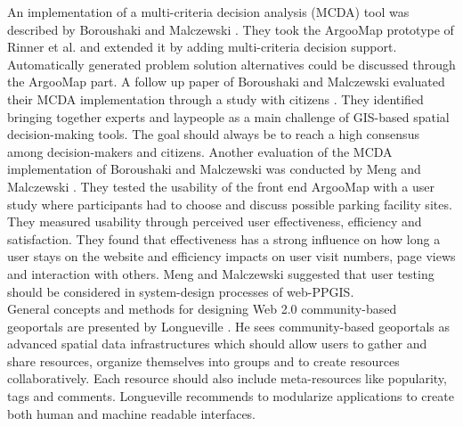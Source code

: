 An implementation of a multi-criteria decision analysis (MCDA) tool was described by Boroushaki and Malczewski \cite{Boroushaki2010_ParticipatoryGIS}. They took the ArgooMap prototype of Rinner et al. \cite{Rinner2009_Web2_argumap} and extended it by adding multi-criteria decision support. Automatically generated problem solution alternatives could be discussed through the ArgooMap part. A follow up paper of Boroushaki and Malczewski evaluated their MCDA implementation through a study with citizens \cite{Boroushaki2010_Consensus_measurement}. They identified bringing together experts and laypeople as a main challenge of GIS-based spatial decision-making tools. The goal should always be to reach a high consensus among decision-makers and citizens. Another evaluation of the MCDA implementation of Boroushaki and Malczewski was conducted by Meng and Malczewski \cite{Meng2010_ArgooMap_evaluation}. They tested the usability of the front end ArgooMap with a user study where participants had to choose and discuss possible parking facility sites. They measured usability through perceived user effectiveness, efficiency and satisfaction. They found that effectiveness has a strong influence on how long a user stays on the website and efficiency impacts on user visit numbers, page views and interaction with others. Meng and Malczewski suggested that user testing should be considered in system-design processes of web-PPGIS.\\
General concepts and methods for designing Web 2.0 community-based geoportals are presented by Longueville \cite{Longueville2010_community_based_geoportals_web20}. He sees community-based geoportals as advanced spatial data infrastructures which should allow users to gather and share resources, organize themselves into groups and to create resources collaboratively. Each resource should also include meta-resources like popularity, tags and comments. Longueville recommends to modularize applications to create both human and machine readable interfaces.\\
